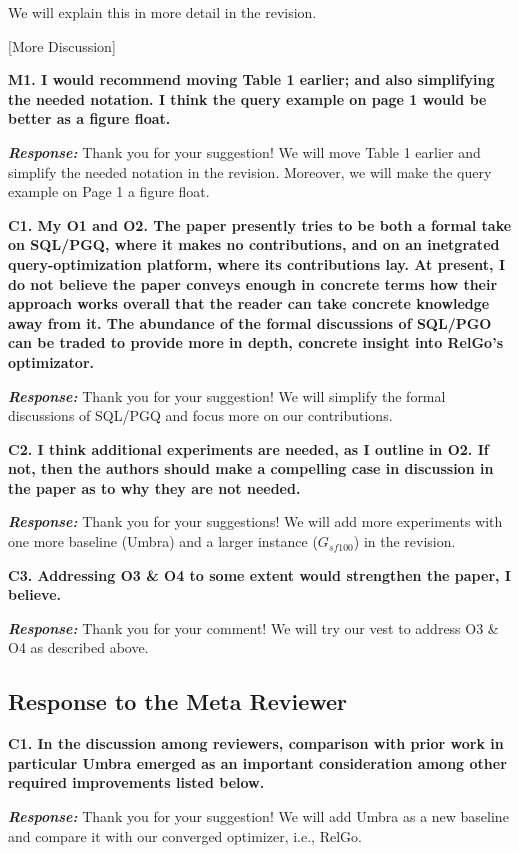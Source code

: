 We will explain this in more detail in the revision.

[More Discussion]


\textbf{M1. I would recommend moving Table 1 earlier; and also simplifying the needed notation. I think the query example on page 1 would be better as a figure float. }

\textbf{\textit{Response: }}
Thank you for your suggestion! We will move Table 1 earlier and simplify the needed notation in the revision. Moreover, we will make the query example on Page 1 a figure float.

\textbf{
C1. My O1 and O2. The paper presently tries to be both a formal take on SQL/PGQ, where it makes no contributions, and on an inetgrated query-optimization platform, where its contributions lay. At present, I do not believe the paper conveys enough in concrete terms how their approach works overall that the reader can take concrete knowledge away from it. The abundance of the formal discussions of SQL/PGO can be traded to provide more in depth, concrete insight into RelGo's optimizator.}

\textbf{\textit{Response: }}
Thank you for your suggestion! We will simplify the formal discussions of SQL/PGQ and focus more on our contributions.


\textbf{
C2. I think additional experiments are needed, as I outline in O2. If not, then the authors should make a compelling case in discussion in the paper as to why they are not needed.}

\textbf{\textit{Response: }}
Thank you for your suggestions! We will add more experiments with one more baseline (Umbra) and a larger instance ($G_{sf100}$) in the revision.


\textbf{
C3. Addressing O3 \& O4 to some extent would strengthen the paper, I believe.}

\textbf{\textit{Response: }}
Thank you for your comment! We will try our vest to address O3 \& O4 as described above. 

\subsection{Response to the Meta Reviewer}

\textbf{
C1. In the discussion among reviewers, comparison with prior work in particular Umbra emerged as an important consideration among other required improvements listed below.}

\textbf{\textit{Response: }}
Thank you for your suggestion! We will add Umbra as a new baseline and compare it with our converged optimizer, i.e., RelGo.


